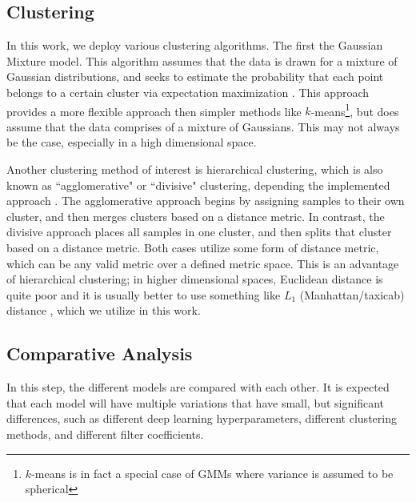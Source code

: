 \documentclass[conference]{IEEEtran}
\begin{document}
\subsection{Clustering}
In this work, we deploy various clustering algorithms. 
The first the Gaussian Mixture model. 
This algorithm assumes that the data is drawn for a mixture of Gaussian distributions, and seeks to estimate the probability that each point belongs to a certain cluster via expectation maximization \cite{dempster_maximum_1977}. 
This approach provides a more flexible approach then simpler methods like $k$-means\footnote{$k$-means is in fact a special case of GMMs where variance is assumed to be spherical}, but does assume that the data comprises of a mixture of Gaussians. 
This may not always be the case, especially in a high dimensional space.

Another clustering method of interest is hierarchical clustering, which is also known as ``agglomerative" or ``divisive" clustering, depending the implemented approach \cite{szekely_hierarchical_2005}. 
The agglomerative approach begins by assigning samples to their own cluster, and then merges clusters based on a distance metric. 
In contrast, the divisive approach places all samples in one cluster, and then splits that cluster based on a distance metric. 
Both cases utilize some form of distance metric, which can be any valid metric over a defined metric space. 
This is an advantage of hierarchical clustering; in higher dimensional spaces, Euclidean distance is quite poor and it is usually better to use something like $L_1$ (Manhattan/taxicab) distance \cite{domingos_few_2012}, which we utilize in this work. 


\subsection{Comparative Analysis}
In this step, the different models are compared with each other. 
It is expected that each model will have multiple variations that have small, but significant differences, such as different deep learning hyperparameters, different clustering methods, and different filter coefficients. 
\end{document}
